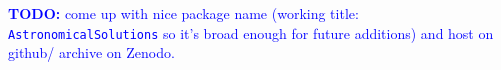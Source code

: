 \documentclass[draft]{agujournal2019}
\newcommand{\ijk}{\textcolor{blue}}
\begin{document}
\ijk{\textbf{TODO:} come up with nice package name (working title: \texttt{AstronomicalSolutions} so it's broad enough for future additions) and host on github/ archive on Zenodo.}







\acknowledgments
\end{document}
